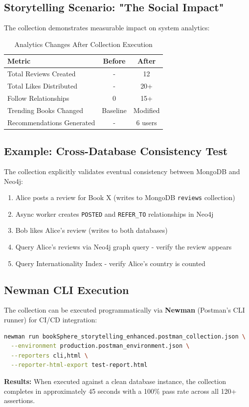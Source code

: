 \subsection{Storytelling Scenario: "The Social Impact"}
The collection demonstrates measurable impact on system analytics:

\begin{table}[H]
    \centering
    \caption{Analytics Changes After Collection Execution}
    \label{tab:postman_analytics_impact}
    \begin{tabular}{@{}lcc@{}}
        \toprule
        \textbf{Metric} & \textbf{Before} & \textbf{After} \\ \midrule
        Total Reviews Created & - & 12 \\
        Total Likes Distributed & - & 20+ \\
        Follow Relationships & 0 & 15+ \\
        Trending Books Changed & Baseline & Modified \\
        Recommendations Generated & - & 6 users \\
        \bottomrule
    \end{tabular}
\end{table}

\subsection{Example: Cross-Database Consistency Test}
The collection explicitly validates eventual consistency between MongoDB and Neo4j:

\begin{enumerate}
    \item Alice posts a review for Book X (writes to MongoDB \texttt{reviews} collection)
    \item Async worker creates \texttt{POSTED} and \texttt{REFER\_TO} relationships in Neo4j
    \item Bob likes Alice's review (writes to both databases)
    \item Query Alice's reviews via Neo4j graph query - verify the review appears
    \item Query Internationality Index - verify Alice's country is counted
\end{enumerate}

\subsection{Newman CLI Execution}
The collection can be executed programmatically via \textbf{Newman} (Postman's CLI runner) for CI/CD integration:

\begin{lstlisting}[language=bash, caption={Newman Command Example}]
newman run bookSphere_storytelling_enhanced.postman_collection.json \
  --environment production.postman_environment.json \
  --reporters cli,html \
  --reporter-html-export test-report.html
\end{lstlisting}

\textbf{Results:} When executed against a clean database instance, the collection completes in approximately 45 seconds with a 100\% pass rate across all 120+ assertions.
